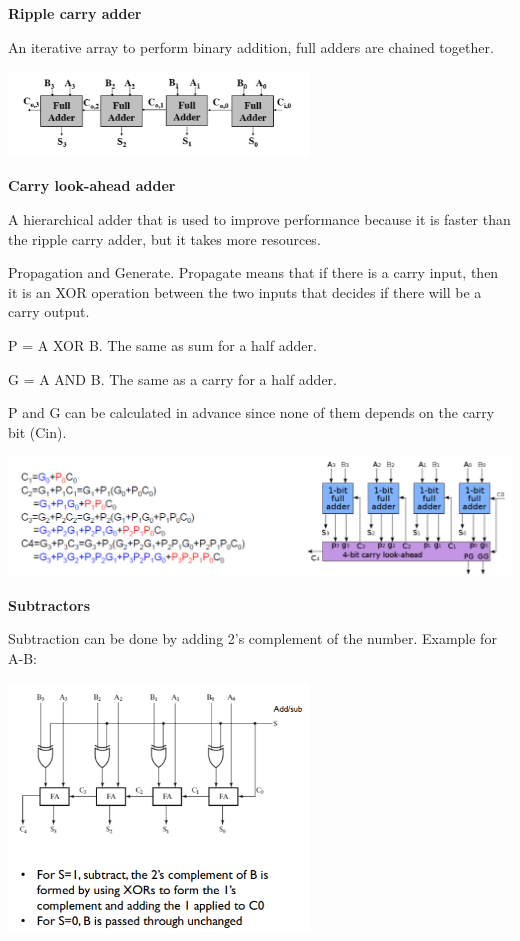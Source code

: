 \textbf{Ripple carry adder}

An iterative array to perform binary addition, full adders are chained
together.

\begin{center}
	\includegraphics[width=0.6\textwidth]{images/rippleCarry.png}
\end{center}

\textbf{Carry look-ahead adder}

A hierarchical adder that is used to improve performance
because it is faster than the ripple carry adder, but it takes
more resources.

Propagation and Generate.
Propagate means that if there is a carry input, then it is
an XOR operation between the two inputs that decides if
there will be a carry output.

P = A XOR B. The same as sum for a half adder.

G = A AND B. The same as a carry for a half adder.

P and G can be calculated in advance since none of them
depends on the carry bit (Cin).

\begin{center}
	\includegraphics[width=\textwidth]{images/lookAhead.png}
\end{center}


\textbf{Subtractors}

Subtraction can be done by adding 2's complement of the number.
Example for A-B:

\begin{center}
	\includegraphics[width=0.6\textwidth]{images/subtract.png}
\end{center}


